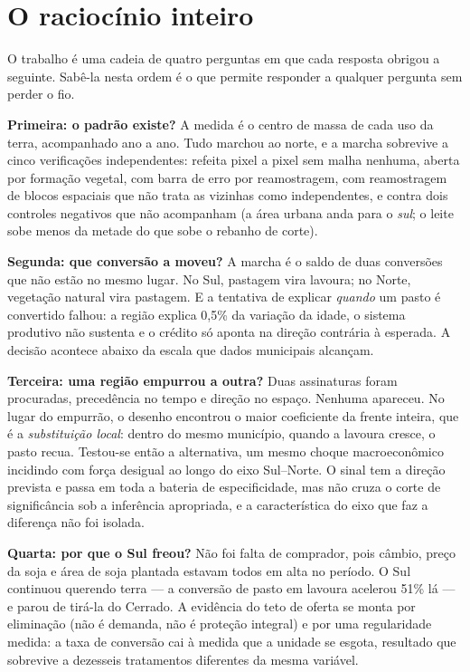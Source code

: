 \section{O raciocínio inteiro}

O trabalho é uma cadeia de quatro perguntas em que cada resposta obrigou a
seguinte. Sabê-la nesta ordem é o que permite responder a qualquer pergunta
sem perder o fio.

\vspace{6pt}
\textbf{Primeira: o padrão existe?} A medida é o centro de massa de cada uso da
terra, acompanhado ano a ano. Tudo marchou ao norte, e a marcha sobrevive a
cinco verificações independentes: refeita pixel a pixel sem malha nenhuma,
aberta por formação vegetal, com barra de erro por reamostragem, com
reamostragem de blocos espaciais que não trata as vizinhas como independentes,
e contra dois controles negativos que não acompanham (a área urbana anda para o
\emph{sul}; o leite sobe menos da metade do que sobe o rebanho de corte).

\textbf{Segunda: que conversão a moveu?} A marcha é o saldo de duas conversões
que não estão no mesmo lugar. No Sul, pastagem vira lavoura; no Norte,
vegetação natural vira pastagem. E a tentativa de explicar \emph{quando} um
pasto é convertido falhou: a região explica 0,5\% da variação da idade, o
sistema produtivo não sustenta e o crédito só aponta na direção contrária à
esperada. A decisão acontece abaixo da escala que dados municipais alcançam.

\textbf{Terceira: uma região empurrou a outra?} Duas assinaturas foram
procuradas, precedência no tempo e direção no espaço. Nenhuma apareceu. No
lugar do empurrão, o desenho encontrou o maior coeficiente da frente inteira,
que é a \emph{substituição local}: dentro do mesmo município, quando a lavoura
cresce, o pasto recua. Testou-se então a alternativa, um mesmo choque
macroeconômico incidindo com força desigual ao longo do eixo Sul--Norte. O
sinal tem a direção prevista e passa em toda a bateria de especificidade, mas
não cruza o corte de significância sob a inferência apropriada, e a
característica do eixo que faz a diferença não foi isolada. 

\textbf{Quarta: por que o Sul freou?} Não foi falta de comprador, pois câmbio,
preço da soja e área de soja plantada estavam todos em alta no período. O Sul
continuou querendo terra --- a conversão de pasto em lavoura acelerou 51\% lá
--- e parou de tirá-la do Cerrado. A evidência do teto de oferta se monta por
eliminação (não é demanda, não é proteção integral) e por uma regularidade
medida: a taxa de conversão cai à medida que a unidade se esgota, resultado que
sobrevive a dezesseis tratamentos diferentes da mesma variável. 

